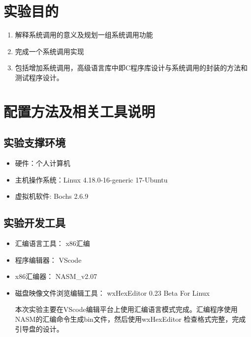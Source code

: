\documentclass[a4paper,11pt,UTF8]{ctexart}
\begin{document}
\section{实验目的}
	
	\begin{enumerate}
		\item 解释系统调用的意义及规划一组系统调用功能
		\item 完成一个系统调用实现
		\item 包括增加系统调用，高级语言库中即C程序库设计与系统调用的封装的方法和测试程序设计。
	\end{enumerate}

	

\section{配置方法及相关工具说明}

\subsection{实验支撑环境}
	\begin{itemize} 
		\item 硬件：个人计算机
		\item 主机操作系统：Linux 4.18.0-16-generic 17-Ubuntu
		\item 虚拟机软件: Bochs 2.6.9
	\end{itemize}
	
	 
\subsection{实验开发工具}

	\begin{itemize} 
	\item 汇编语言工具： x86汇编
	\item 程序编辑器： VScode 
	\item x86汇编器： NASM\_v2.07
	\item 磁盘映像文件浏览编辑工具： wxHexEditor 0.23 Beta For Linux
	
	本次实验主要在VScode编辑平台上使用汇编语言模式完成。汇编程序使用NASM的汇编命令生成bin文件，然后使用wxHexEditor 检查格式完整，完成引导盘的设计。
\end{itemize}
\clearpage
\end{document}
